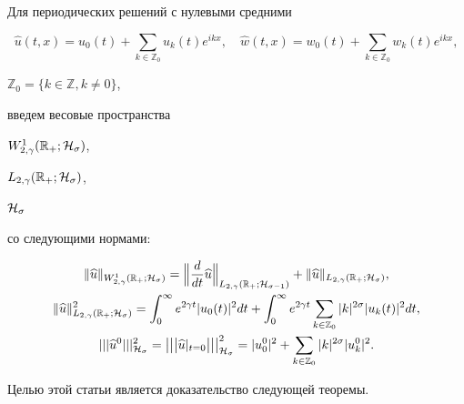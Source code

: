 Для периодических решений с нулевыми средними

$$

\widehat{u}(t,x)=u_0(t)+\sum_{k\in \mathbb Z_0} u_k(t) e^{ikx},\quad

\widehat{w}(t,x)=w_0(t)+\sum_{k\in \mathbb Z_0} w_k(t) e^{ikx},

$$

$\mathbb Z_0=\{k\in \mathbb Z, k\ne0\}$,

введем весовые пространства 

$W^1_{2,\gamma}(\mathbb R_{+};{\cal H}_\sigma)$, 

$L_{2,\gamma}(\mathbb R_{+};{\cal H}_\sigma)$, 

${\cal H}_\sigma$ 

со следующими нормами:

\begin{gather*}

\|\widehat{u}\|_{W^1_{2,\gamma}(\mathbb R_{+};{\cal H}_\sigma)}=

\Bigl\|\frac{d}{dt}  \widehat{u} \Bigr\|_{L_{2,\gamma}(\mathbb R_{+};{\cal H}_{\sigma-1})}

+

\|\widehat{u}\|_{L_{2,\gamma}(\mathbb R_{+};{\cal H}_\sigma)},

\\

\|\widehat{u}\|^2_{L_{2,\gamma}(\mathbb R_{+};{\cal H}_\sigma)}=\int_0^\infty 

e^{2\gamma t}|u_0(t)|^2 dt+

\int_0^\infty e^{2\gamma t} \sum_{k\in \mathbb Z_0} |k|^{2\sigma} |u_k(t)|^2 dt,

\\

|||\widehat{u}^0|||_{{\cal H}_\sigma} ^2= \bigl|\bigl|\bigl|\widehat{u}|_{t=0} \bigr| \bigr| \bigr|^2_{{\cal H}_\sigma}=|u^0_0|^2+\sum_{k\in \mathbb Z_0} |k|^{2\sigma} |u^0_k|^2.

\end{gather*}







Целью этой статьи является доказательство следующей теоремы.



\smallskip



